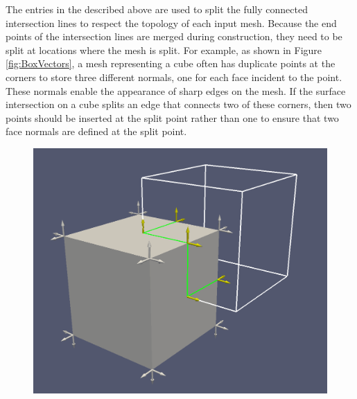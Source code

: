 \documentclass{InsightArticle}
\begin{document}
The entries in the  described above are used to split the fully connected intersection lines to respect the topology of each input mesh. Because the end points of the intersection lines are merged during construction, they need to be split at locations where the mesh is split. For example, as shown in Figure \ref{fig:BoxVectors}, a mesh representing a cube often has duplicate points at the corners to store three different normals, one for each face incident to the point. These normals enable the appearance of sharp edges on the mesh. If the surface intersection on a cube splits an edge that connects two of these corners, then two points should be inserted at the split point rather than one to ensure that two face normals are defined at the split point.

\begin{figure}
\centering
\includegraphics[scale=0.25]{Figures/BoxNormals}
\label{fig:BoxNormals}
\end{figure}
\end{document}
